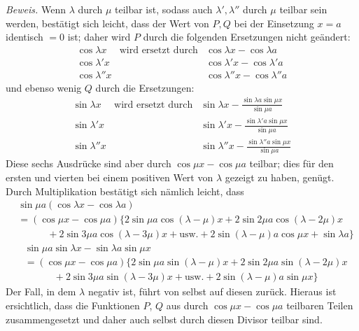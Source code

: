\textit{Beweis.} Wenn $\lambda$ durch $\mu$ teilbar ist, sodass auch $\lambda',\lambda''$ durch $\mu$ teilbar sein werden, bestätigt sich leicht, dass der Wert von $P,Q$ bei der Einsetzung $x=a$ identisch $=0$ ist; daher wird $P$ durch die folgenden Ersetzungen nicht geändert:
\[
\begin{array}{lll}
\cos\lambda x&\text{wird ersetzt durch}&\cos\lambda x-\cos\lambda a\\
\cos\lambda'x&&\cos\lambda'x-\cos\lambda'a\\
\cos\lambda''x&&\cos\lambda''x-\cos\lambda''a
\end{array}
\]
und ebenso wenig $Q$ durch die Ersetzungen:
\[
\begin{array}{lll}
\sin\lambda x&\text{wird ersetzt durch}&\displaystyle\sin\lambda x-\frac{\sin\lambda a\sin\mu x}{\sin\mu a}\\[6pt]
\sin\lambda'x&&\displaystyle\sin\lambda'x-\frac{\sin\lambda'a\sin\mu x}{\sin\mu a}\\[6pt]
\sin\lambda''x&&\displaystyle\sin\lambda''x-\frac{\sin\lambda''a\sin\mu x}{\sin\mu a}
\end{array}
\]
Diese sechs Ausdrücke sind aber durch $\cos\mu x-\cos\mu a$ teilbar; dies für den ersten und vierten bei einem positiven Wert von $\lambda$ gezeigt zu haben, genügt. Durch Multiplikation bestätigt sich nämlich leicht, dass
\[
\begin{aligned}
&\sin\mu a(\cos\lambda x-\cos\lambda a)\\[5pt]
&=(\cos\mu x-\cos\mu a)\{2\sin\mu a\cos(\lambda-\mu)x+2\sin 2\mu a\cos(\lambda-2\mu)x\\[5pt]
&\quad \qquad+2\sin 3\mu a\cos(\lambda-3\mu)x+\text{usw.}+2\sin(\lambda-\mu)a\cos\mu x+\sin\lambda a\}
\end{aligned}
\]
\[
\begin{aligned}
&\sin\mu a\sin\lambda x-\sin\lambda a\sin\mu x\\[5pt]
&=(\cos\mu x-\cos\mu a)\{2\sin\mu a\sin(\lambda-\mu)x+2\sin 2\mu a\sin(\lambda-2\mu)x\\[5pt]
&\quad \qquad+2\sin 3\mu a\sin(\lambda-3\mu)x+\text{usw.}+2\sin(\lambda-\mu)a\sin\mu x\}
\end{aligned}
\]
Der Fall, in dem $\lambda$ negativ ist, führt von selbst auf diesen zurück. Hieraus ist ersichtlich, dass die Funktionen
$P$, $Q$ aus durch $\cos\mu x-\cos\mu a$ teilbaren Teilen zusammengesetzt und daher auch selbst durch diesen Divisor teilbar sind.

